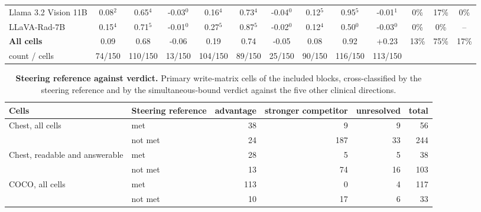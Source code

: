 \documentclass{article}
\begin{document}
\begin{table}[t]
\begin{tabular}{l@{\hspace{3pt}}ccc@{\hspace{4pt}}ccc@{\hspace{4pt}}ccc@{\hspace{4pt}}ccc}
Llama 3.2 Vision 11B & \cellcolor{cfSage2}0.08$^{2}$ & \cellcolor{cfSage2}0.65$^{4}$ & \cellcolor{cfSlate2}-0.03$^{0}$ & \cellcolor{cfSage3}0.16$^{4}$ & \cellcolor{cfSage2}0.73$^{4}$ & \cellcolor{cfSlate2}-0.04$^{0}$ & \cellcolor{cfSage3}0.12$^{5}$ & \cellcolor{cfSage4}0.95$^{5}$ & \cellcolor{cfSlate1}-0.01$^{1}$ & \cellcolor{cfTerra1}0\% & \cellcolor{cfTerra2}17\% & 0\% \\
LLaVA-Rad-7B & \cellcolor{cfSage3}0.15$^{4}$ & \cellcolor{cfSage2}0.71$^{5}$ & \cellcolor{cfSlate1}-0.01$^{0}$ & \cellcolor{cfSage4}0.27$^{5}$ & \cellcolor{cfSage3}0.87$^{5}$ & \cellcolor{cfSlate1}-0.02$^{0}$ & \cellcolor{cfSage3}0.12$^{4}$ & \cellcolor{cfSage1}0.50$^{0}$ & \cellcolor{cfSlate2}-0.03$^{0}$ & \cellcolor{cfTerra1}0\% & \cellcolor{cfTerra1}0\% & -- \\
\midrule
\textbf{All cells} & 0.09 & 0.68 & -0.06 & 0.19 & 0.74 & -0.05 & 0.08 & 0.92 & +0.23 & 13\% & 75\% & 17\% \\
\quad count / cells & 74/150 & 110/150 & 13/150 & 104/150 & 89/150 & 25/150 & 90/150 & 116/150 & 113/150 & & & \\
\bottomrule
\end{tabular}
\end{table}

\begin{table}[t]
\centering
\small
\setlength{\tabcolsep}{4pt}
\caption{\textbf{Steering reference against verdict.} Primary write-matrix cells of the included blocks, cross-classified by the steering reference and by the simultaneous-bound verdict against the five other clinical directions.}
\label{tab:cf-contingency}
\begin{tabular}{llrrrr}
\toprule
Cells & Steering reference & \multicolumn{1}{c}{advantage} & \multicolumn{1}{c}{stronger competitor} & \multicolumn{1}{c}{unresolved} & \multicolumn{1}{c}{total}\\
\midrule
Chest, all cells & met & 38 & 9 & 9 & 56 \\
 & not met & 24 & 187 & 33 & 244 \\
Chest, readable and answerable & met & 28 & 5 & 5 & 38 \\
 & not met & 13 & 74 & 16 & 103 \\
COCO, all cells & met & 113 & 0 & 4 & 117 \\
 & not met & 10 & 17 & 6 & 33 \\
\bottomrule
\end{tabular}
\end{table}
\end{document}
